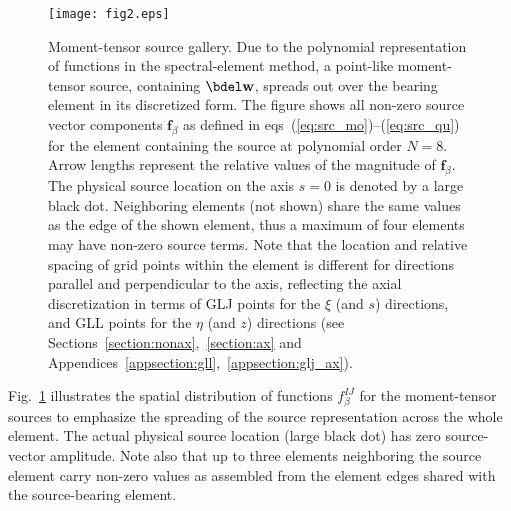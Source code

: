 \begin{figure}[htb!]
\begin{center}
\texttt{[image: fig2.eps]}
\caption{Moment-tensor source gallery. Due to the polynomial representation of
functions in the spectral-element method, a point-like moment-tensor source,
containing $\bdel\mathbf{w}$, spreads out over the bearing
element in its discretized form. The figure shows all non-zero source vector
components $\mathbf{f}_\beta$ as defined in
eqs~(\ref{eq:src_mo})--(\ref{eq:src_qu}) for
the element containing the source at polynomial order $N=8$.
Arrow lengths represent the relative values of the magnitude of
$\mathbf{f}_\beta$. The physical source location on the axis $s=0$ is denoted
by a large black dot. Neighboring elements (not shown) share
the same values as the edge of the shown element, thus a maximum of four
elements may have non-zero source terms. Note that the location and relative
spacing of grid points within the element is different for directions
parallel and perpendicular to the axis, reflecting the axial discretization in
terms of GLJ points for the $\xi$ (and $s$) directions, and GLL points for the
$\eta$ (and $z$) directions
(see Sections~\ref{section:nonax},~\ref{section:ax} and
Appendices~\ref{appsection:gll},~\ref{appsection:glj_ax}).}
\label{fig2}
\end{center}
\end{figure}
%
Fig.~\ref{fig2} illustrates the spatial distribution of functions
$f^{IJ}_\beta$ for the moment-tensor sources to emphasize the spreading of
the source representation across the whole element.
The actual physical source location (large black dot) has zero
source-vector amplitude. Note also that up to three elements neighboring the
source element carry non-zero values as assembled from the element edges
shared with the source-bearing element.
%
